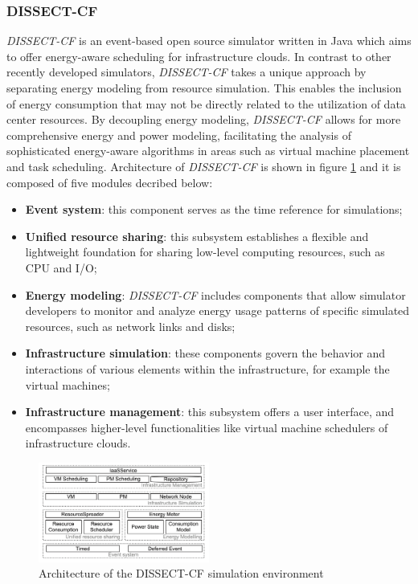 {\subsubsection*{DISSECT-CF}
\emph{DISSECT-CF} \cite{kecskemeti2015dissect} is an event-based open source simulator written in Java which aims to offer energy-aware scheduling for infrastructure clouds. In contrast to other recently developed simulators, \emph{DISSECT-CF} takes a unique approach by separating energy modeling from resource simulation. This enables the inclusion of energy consumption that may not be directly related to the utilization of data center resources. By decoupling energy modeling, \emph{DISSECT-CF} allows for more comprehensive energy and power modeling, facilitating the analysis of sophisticated energy-aware algorithms in areas such as virtual machine placement and task scheduling. Architecture of \emph{DISSECT-CF} is shown in figure \ref{fig:dissect-cf_arch} and it is composed of five modules decribed below:
\begin{itemize}
    \item \textbf{Event system}: this component serves as the time reference for simulations;
    \item \textbf{Unified resource sharing}: this subsystem establishes a flexible and lightweight foundation for sharing low-level computing resources, such as CPU and I/O;
    \item \textbf{Energy modeling}: \emph{DISSECT-CF} includes components that allow simulator developers to monitor and analyze energy usage patterns of specific simulated resources, such as network links and disks;
    \item \textbf{Infrastructure simulation}: these components govern the behavior and interactions of various elements within the infrastructure, for example the virtual machines;
    \item \textbf{Infrastructure management}: this subsystem offers a user interface, and encompasses higher-level functionalities like virtual machine schedulers of infrastructure clouds.
\end{itemize}
\begin{figure}[h]
    \centering
    \includegraphics[width=0.5\textwidth]{chapters/images/dissect-cf_arch.png}
    \caption{Architecture of the DISSECT-CF simulation environment}
    \label{fig:dissect-cf_arch}
\end{figure}

}
